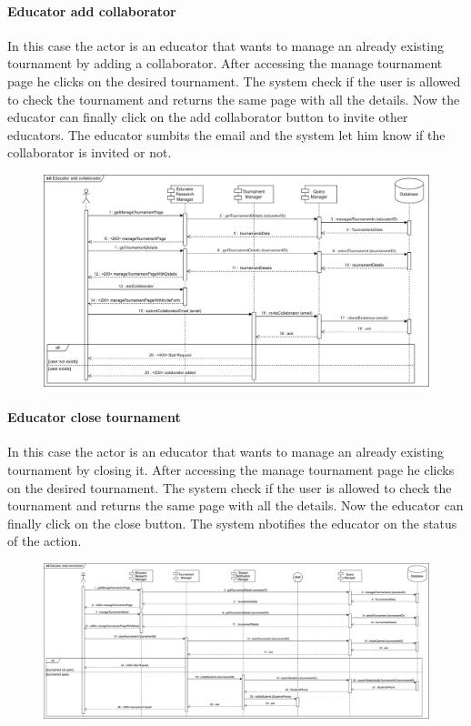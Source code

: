 \documentclass[12pt, a4paper]{report}
\begin{document}
    \paragraph*{Educator add collaborator}
    In this case the actor is an educator that wants to manage an already existing tournament by adding a collaborator. 
    After accessing the manage tournament page he clicks on the desired tournament. 
    The system check if the user is allowed to check the tournament and returns the same page with all the details. 
    Now the educator can finally click on the add collaborator button to invite other educators. 
    The educator sumbits the email and the system let him know if the collaborator is invited or not. 
    \begin{figure}[H]
        \centering
        \includegraphics[width=1.0\linewidth]{images/eacrv.png}
    \end{figure}

    \paragraph*{Educator close tournament}
    In this case the actor is an educator that wants to manage an already existing tournament by closing it. 
    After accessing the manage tournament page he clicks on the desired tournament. 
    The system check if the user is allowed to check the tournament and returns the same page with all the details. 
    Now the educator can finally click on the close button. 
    The system nbotifies the educator on the status of the action. 
    \begin{figure}[H]
        \centering
        \includegraphics[width=1.0\linewidth]{images/ectrv1.png}
    \end{figure}
\end{document}
